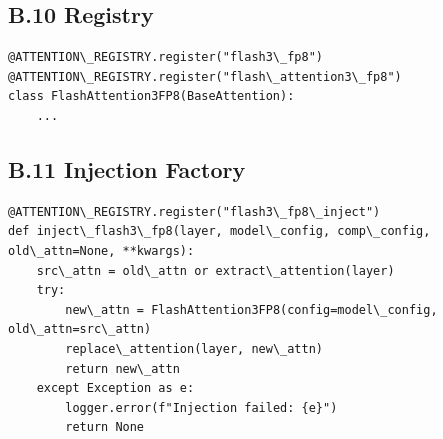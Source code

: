 \subsection{B.10 Registry}

\begin{lstlisting}
@ATTENTION\_REGISTRY.register("flash3\_fp8")
@ATTENTION\_REGISTRY.register("flash\_attention3\_fp8")
class FlashAttention3FP8(BaseAttention):
    ...
\end{lstlisting}

\subsection{B.11 Injection Factory}

\begin{lstlisting}
@ATTENTION\_REGISTRY.register("flash3\_fp8\_inject")
def inject\_flash3\_fp8(layer, model\_config, comp\_config, old\_attn=None, **kwargs):
    src\_attn = old\_attn or extract\_attention(layer)
    try:
        new\_attn = FlashAttention3FP8(config=model\_config, old\_attn=src\_attn)
        replace\_attention(layer, new\_attn)
        return new\_attn
    except Exception as e:
        logger.error(f"Injection failed: {e}")
        return None
\end{lstlisting}

